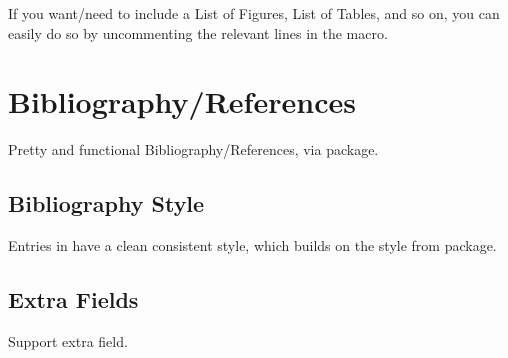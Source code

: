 \begin{remark}
    If you want/need to include a List of Figures, List of Tables, and so on, you can easily do so by uncommenting the relevant lines in the \custommacro{\contentsandlists} macro.
\end{remark}


\section{Bibliography/References}%
\label{sec:Bibliography/References}

Pretty and functional Bibliography/References, via  package.

\subsection{Bibliography Style}%
\label{sub:Bibliography Style}

Entries in  have a clean consistent style, which builds on the  style from  package.


\subsection{Extra Fields}%
\label{sub:Extra Fields}

Support extra  field.

